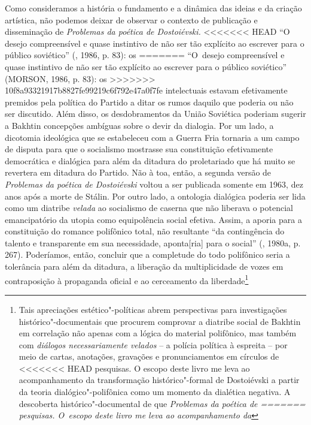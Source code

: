 {Como consideramos a história o fundamento e a dinâmica das ideias e da
criação artística, não podemos deixar de observar o contexto de
publicação e disseminação de \emph{Problemas da poética de Dostoiévski.}
<<<<<<< HEAD
``O desejo compreensível e quase instintivo de não ser tão explícito ao
escrever para o público soviético'' (, 1986, p. 83): os
=======
``O~desejo compreensível e quase instintivo de não ser tão explícito ao
escrever para o público soviético'' (MORSON, 1986, p. 83): os
>>>>>>> 10f8a93321917b8827fe99219c6f792e47a0f7fe
intelectuais estavam efetivamente premidos pela política do Partido a
ditar os rumos daquilo que poderia ou não ser discutido. Além disso, os
desdobramentos da União Soviética poderiam sugerir a Bakhtin concepções
ambíguas sobre o devir da dialogia. Por um lado, a dicotomia ideológica
que se estabeleceu com a Guerra Fria tornaria a  um campo de disputa
para que o socialismo mostrasse sua constituição efetivamente
democrática e dialógica para além da ditadura do proletariado que há
muito se revertera em ditadura do Partido. Não à toa, então, a segunda
versão de \emph{Problemas da poética de Dostoiévski} voltou a ser
publicada somente em 1963, dez anos após a morte de Stálin. Por outro
lado, a ontologia dialógica poderia ser lida como um diatribe
\emph{velada} ao socialismo de caserna que não liberava o potencial
emancipatório da utopia como equipolência social efetiva. Assim, a
aporia para a constituição do romance polifônico total, não resultante
``da contingência do talento e transparente em sua necessidade,
aponta{[}ria{]} para o social'' (, 1980a, p. 267). Poderíamos,
então, concluir que a completude do todo polifônico seria a tolerância
para além da ditadura, a liberação da multiplicidade de vozes em
contraposição à propaganda oficial e ao cerceamento da
liberdade\footnote{Tais apreciações estético"-políticas abrem
  perspectivas para investigações histórico"-documentais que procurem
  comprovar a diatribe social de Bakhtin em correlação não apenas com a
  lógica do material polifônico, mas também com \emph{diálogos
  necessariamente velados} -- a polícia política à espreita -- por meio
  de cartas, anotações, gravações e pronunciamentos em círculos de
<<<<<<< HEAD
  pesquisas. O escopo deste livro me leva ao acompanhamento da
  transformação histórico"-formal de Dostoiévski a partir da teoria
  dialógico"-polifônica como um momento da dialética negativa. A
  descoberta histórico"-documental de que \emph{Problemas da poética de
=======
  pesquisas. O~escopo deste livro me leva ao acompanhamento da
}}}

